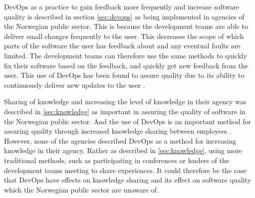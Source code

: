 DevOps as a practice to gain feedback more frequently and increase software quality is described in section \autoref{sec:devops} as being implemented in agencies of the Norwegian public sector. This is because the development teams are able to deliver small changes frequently to the user. This decreases the scope of which parts of the software the user has feedback about and any eventual faults are limited. The development teams can therefore use the same methods to quickly fix their software based on the feedback, and quickly get new feedback from the user. This use of DevOps has been found to assure quality due to its ability to continuously deliver new updates to the user \cite{am_2020}\cite{smm_2018}\cite{ml_2022}.


Sharing of knowledge and increasing the level of knowledge in their agency was described in \autoref{sec:knowledge} as important in assuring the quality of software in the Norwegian public sector. And the use of DevOps is an important method for assuring quality through increased knowledge sharing between employees \cite{smm_2018}\cite{mm_2021}. However, none of the agencies described DevOps as a method for increasing knowledge in their agency. Rather as described in \autoref{sec:knowledge}, using more traditional methods, such as participating in conferences or leaders of the development teams meeting to share experiences. It could therefore be the case that DevOps have effects on knowledge sharing and its effect on software quality which the Norwegian public sector are unaware of.


